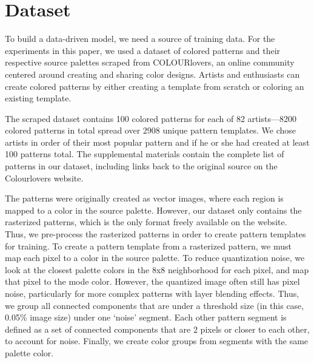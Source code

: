 \section{Dataset}
\label{sec:dataset}

To build a data-driven model, we need a source of training data. For the experiments in this paper, we used a dataset of colored patterns and their respective source palettes scraped from COLOURlovers, an online community centered around creating and sharing color designs. Artists and enthusiasts can create colored patterns by either creating a template from scratch or coloring an existing template. 

The scraped dataset contains 100 colored patterns for each of 82 artists---8200 colored patterns in total spread over 2908 unique pattern templates. We chose artists in order of their most popular pattern and if he or she had created at least 100 patterns total. The supplemental materials contain the complete list of patterns in our dataset, including links back to the original source on the Colourlovers website.

The patterns were originally created as vector images, where each region is mapped to a color in the source palette. However, our dataset only contains the rasterized patterns, which is the only format freely available on the website. Thus, we pre-process the rasterized patterns in order to create pattern templates for training. To create a pattern template from a rasterized pattern, we must map each pixel to a color in the source palette. To reduce quantization noise, we look at the closest palette colors in the 8x8 neighborhood for each pixel, and map that pixel to the mode color. However, the quantized image often still has pixel noise, particularly for more complex patterns with layer blending effects. Thus, we group all connected components that are under a threshold size (in this case, 0.05\% image size) under one `noise' segment. Each other pattern segment is defined as a set of connected components that are 2 pixels or closer to each other, to account for noise. Finally, we create color groups from segments with the same palette color.